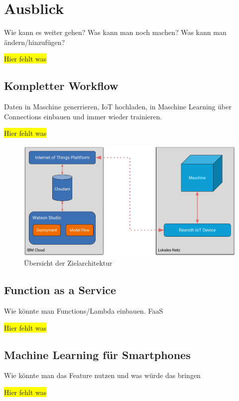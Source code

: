 \chapter{Ausblick}
\label{ch:ausblick}
Wie kann es weiter gehen? Was kann man noch machen? Was kann man ändern/hinzufügen?

\colorbox{yellow}{Hier fehlt was}

\section{Kompletter Workflow}
Daten in Maschine generrieren, IoT hochladen, in Maschine Learning über Connections einbauen und immer wieder
trainieren.

\colorbox{yellow}{Hier fehlt was}

\begin{figure}[h]
    \centering
    \includegraphics[width=\textwidth]{images/kapitel_6/architektur_uebersicht.pdf}
    \caption{Übersicht der Zielarchitektur}
    \label{fig:ausblick_uebersicht}
\end{figure}

\section{Function as a Service}
Wie könnte man Functions/Lambda einbauen. FaaS

\colorbox{yellow}{Hier fehlt was}

\section{Machine Learning für Smartphones}
Wie könnte man das Feature nutzen und was würde das bringen

\colorbox{yellow}{Hier fehlt was}


